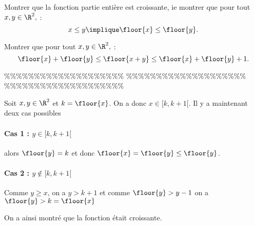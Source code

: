 



\begin{exercice}%
Montrer que la fonction partie entière est croissante, ie montrer que pour tout $x, y\in \R^2,$ : 
$$x\leq y \implique \floor{x} \leq \floor{y}.$$

Montrer que pour tout $x, y\in \R^2,$ : 
$$\floor{x}+\floor{y} \leq \floor{x+y} \leq \floor{x} +\floor{y}+1.$$
\end{exercice}


\%\%\%\%\%\%\%\%\%\%\%\%\%\%\%\%\%\%\%\%
\%\%\%\%\%\%\%\%\%\%\%\%\%\%\%\%\%\%\%\%
\%\%\%\%\%\%\%\%\%\%\%\%\%\%\%\%\%\%\%\%




\begin{correction}

Soit $x,y\in \R^2$ et  $k=\floor{x}$. On a donc $x\in [k,k+1[$. Il y a maintenant deux cas possibles 
\paragraph{Cas 1 : $y\in  [k,k+1[$}
alors $\floor{y}=k$ et donc $\floor{x}=\floor{y}\leq \floor{y}$. 

\paragraph{Cas 2 : $y\notin  [k,k+1[$}
Comme $y\geq x$, on a $y>k+1$ et comme $\floor{y}>y-1$ on a 
$\floor{y} >k =\floor{x}$

On a ainsi montré que la fonction était croissante. 






\end{correction}